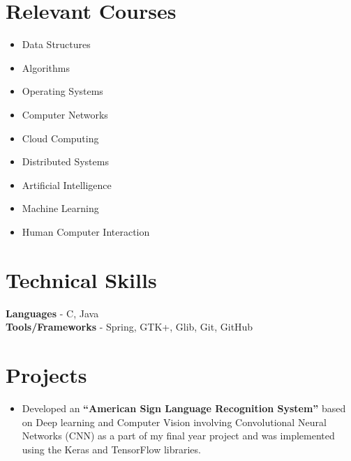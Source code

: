 \documentclass[11pt,margin, centered]{res}
\begin{document}
\begin{resume}
\section{Relevant Courses}
\vspace{8mm}
\begin{multicols}{3}
    \begin{itemize}
      \item Data Structures
      \item Algorithms
      \item Operating Systems
      \item Computer Networks
      \item Cloud Computing
      \item Distributed Systems
      \item Artificial Intelligence
      \item Machine Learning
      \item Human Computer Interaction
    \end{itemize}
\end{multicols}

\section{Technical \hspace{2mm} Skills}
\vspace{8mm}
\textbf{Languages} - C, Java \\
\textbf{Tools/Frameworks} - Spring, GTK+, Glib, Git, GitHub

\section{Projects}
\vspace{10mm}
\begin{itemize}[leftmargin=*]
 \item Developed an \textbf{``American Sign Language Recognition System''} based on Deep learning and Computer Vision involving Convolutional Neural Networks (CNN) as a part of my final year project and was implemented using the Keras and TensorFlow libraries.
\end{itemize}


\end{resume}
\end{document}
